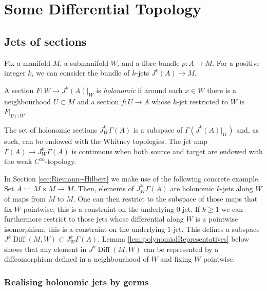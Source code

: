 \documentclass[10pt]{amsart}
\newcommand{\Diff}{{\operatorname{Diff}}}
\numberwithin{theoremalpha}{section}
\numberwithin{equation}{section}
\numberwithin{definition}{section}
\numberwithin{theorem}{section}
\numberwithin{proposition}{section}
\numberwithin{lemma}{section}
\numberwithin{example}{section}
\numberwithin{remark}{section}
\numberwithin{corollary}{section}
\numberwithin{question}{section}
\numberwithin{problem}{section}
\numberwithin{assumption}{section}
\theoremstyle{named}
\numberwithin{equation}{section}
\begin{document}

\section{Some Differential Topology} \label{sec:DiffTop}

\subsection{Jets of sections} \label{ssec:jetsSections}

Fix a manifold $M$, a submanifold $W$, and a fibre bundle $p: A \rightarrow M$. For a positive integer $k$, we can consider the bundle of $k$-jets $J^k(A) \rightarrow M$.
\begin{definition}
A section $F: W \rightarrow J^k(A)|_W$ is \emph{holonomic} if around each $x \in W$ there is a neighbourhood $U \subset M$ and a section $f: U \rightarrow A$ whose $k$-jet restricted to $W$ is $F|_{U \cap W}$.
\end{definition}

The set of holonomic sections $J^k_W\Gamma(A)$ is a subspace of $\Gamma(J^k(A)|_W)$ and, as such, can be endowed with the Whitney topologies. The jet map $\Gamma(A) \rightarrow J^k_W\Gamma(A)$ is continuous when both source and target are endowed with the weak $C^\infty$-topology.

\begin{example} \label{ex:diffeos}
In Section \ref{sec:Riemann--Hilbert} we make use of the following concrete example. Set $A := M \times M \to M$. Then, elements of $J^k_W\Gamma(A)$ are holonomic $k$-jets along $W$ of maps from $M$ to $M$. One can then restrict to the subspace of those maps that fix $W$ pointwise; this is a constraint on the underlying $0$-jet. If $k\geq1$ we can furthermore restrict to those jets whose differential along $W$ is a pointwise isomorphism; this is a constraint on the underlying $1$-jet. This defines a subspace $J^k\Diff(M,W) \subset J^k_W\Gamma(A)$. Lemma \ref{lem:polynomialRepresentatives} below shows that any element in $J^k\Diff(M,W)$ can be represented by a diffeomorphism defined in a neighbourhood of $W$ and fixing $W$ pointwise.
\end{example}

\subsubsection{Realising holonomic jets by germs}
\end{document}

